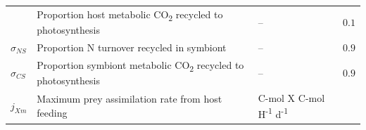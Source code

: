 \documentclass[]{elsarticle} %
\begin{document}
\begin{longtable}[]{@{}llll@{}}
\begin{minipage}[t]{0.09\columnwidth}
\end{minipage} & \begin{minipage}[t]{0.44\columnwidth}\raggedright\strut
Proportion host metabolic CO\textsubscript{2} recycled to
photosynthesis\strut
\end{minipage} & \begin{minipage}[t]{0.24\columnwidth}\raggedright\strut
--\strut
\end{minipage} & \begin{minipage}[t]{0.12\columnwidth}\raggedright\strut
\(0.1\)\strut
\end{minipage}\tabularnewline
\begin{minipage}[t]{0.09\columnwidth}\raggedright\strut
\(\sigma_{NS}\)\strut
\end{minipage} & \begin{minipage}[t]{0.44\columnwidth}\raggedright\strut
Proportion N turnover recycled in symbiont\strut
\end{minipage} & \begin{minipage}[t]{0.24\columnwidth}\raggedright\strut
--\strut
\end{minipage} & \begin{minipage}[t]{0.12\columnwidth}\raggedright\strut
\(0.9\)\strut
\end{minipage}\tabularnewline
\begin{minipage}[t]{0.09\columnwidth}\raggedright\strut
\(\sigma_{CS}\)\strut
\end{minipage} & \begin{minipage}[t]{0.44\columnwidth}\raggedright\strut
Proportion symbiont metabolic CO\textsubscript{2} recycled to
photosynthesis\strut
\end{minipage} & \begin{minipage}[t]{0.24\columnwidth}\raggedright\strut
--\strut
\end{minipage} & \begin{minipage}[t]{0.12\columnwidth}\raggedright\strut
\(0.9\)\strut
\end{minipage}\tabularnewline
\begin{minipage}[t]{0.09\columnwidth}\raggedright\strut
\(j_{Xm}\)\strut
\end{minipage} & \begin{minipage}[t]{0.44\columnwidth}\raggedright\strut
Maximum prey assimilation rate from host feeding\strut
\end{minipage} & \begin{minipage}[t]{0.24\columnwidth}\raggedright\strut
C-mol X C-mol H\textsuperscript{-1} d\textsuperscript{-1}\strut

\end{minipage}
\end{longtable}
\end{document}
